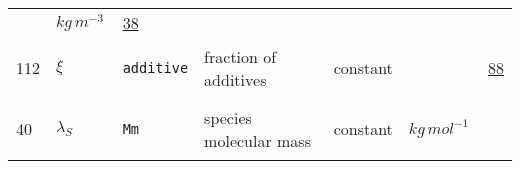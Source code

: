 \begin{longtable}{|p{1cm}|p{2.5cm}|p{4.5cm}|p{8cm}|p{3.0cm}|p{3cm}|p{1cm}|}
             & $ kg \,m^{-3} \, $
             &                 \hyperlink{"e:38"}{ 38 }
                 \\
            112
             & \hypertarget{"v:112"}{ $ {\xi}{_{}} $}
             & \verb|additive|
             & fraction of additives
             & \begin{lay}constant \end{lay}
             & $  $
             &                 \hyperlink{"e:88"}{ 88 }
                 \\
            40
             & \hypertarget{"v:40"}{ $ {\lambda}{_{S}} $}
             & \verb|Mm|
             & species molecular mass
             & \begin{lay}constant \end{lay}
             & $ kg \,mol^{-1} \, $
             & \\
    \end{longtable}